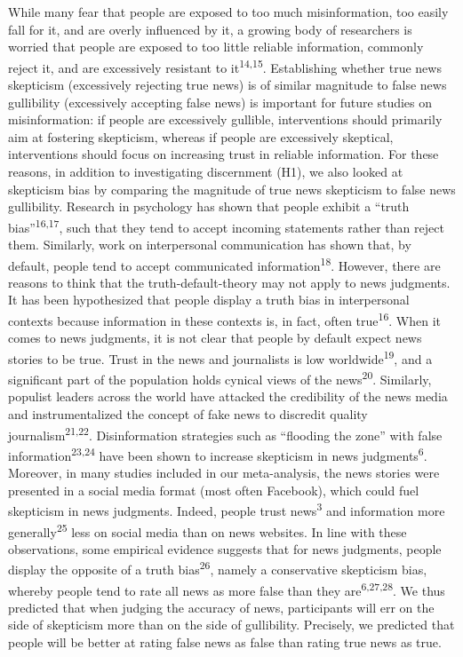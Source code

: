 \documentclass[
  man]{apa6}
\begin{document}
While many fear that people are exposed to too much misinformation, too easily fall for it, and are overly influenced by it, a growing body of researchers is worried that people are exposed to too little reliable information, commonly reject it, and are excessively resistant to it\textsuperscript{14,15}. Establishing whether true news skepticism (excessively rejecting true news) is of similar magnitude to false news gullibility (excessively accepting false news) is important for future studies on misinformation: if people are excessively gullible, interventions should primarily aim at fostering skepticism, whereas if people are excessively skeptical, interventions should focus on increasing trust in reliable information. For these reasons, in addition to investigating discernment (H1), we also looked at skepticism bias by comparing the magnitude of true news skepticism to false news gullibility. Research in psychology has shown that people exhibit a ``truth bias''\textsuperscript{16,17}, such that they tend to accept incoming statements rather than reject them. Similarly, work on interpersonal communication has shown that, by default, people tend to accept communicated information\textsuperscript{18}. However, there are reasons to think that the truth-default-theory may not apply to news judgments. It has been hypothesized that people display a truth bias in interpersonal contexts because information in these contexts is, in fact, often true\textsuperscript{16}. When it comes to news judgments, it is not clear that people by default expect news stories to be true. Trust in the news and journalists is low worldwide\textsuperscript{19}, and a significant part of the population holds cynical views of the news\textsuperscript{20}. Similarly, populist leaders across the world have attacked the credibility of the news media and instrumentalized the concept of fake news to discredit quality journalism\textsuperscript{21,22}. Disinformation strategies such as ``flooding the zone'' with false information\textsuperscript{23,24} have been shown to increase skepticism in news judgments\textsuperscript{6}. Moreover, in many studies included in our meta-analysis, the news stories were presented in a social media format (most often Facebook), which could fuel skepticism in news judgments. Indeed, people trust news\textsuperscript{3} and information more generally\textsuperscript{25} less on social media than on news websites. In line with these observations, some empirical evidence suggests that for news judgments, people display the opposite of a truth bias\textsuperscript{26}, namely a conservative skepticism bias, whereby people tend to rate all news as more false than they are\textsuperscript{6,27,28}. We thus predicted that when judging the accuracy of news, participants will err on the side of skepticism more than on the side of gullibility. Precisely, we predicted that people will be better at rating false news as false than rating true news as true.
\end{document}
